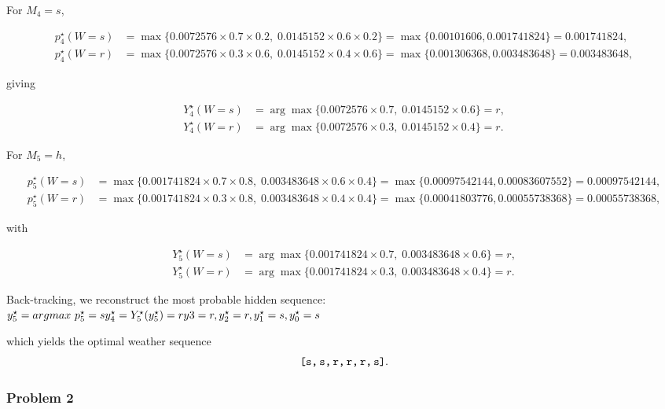 For $M_4=s$,

\[
\begin{aligned}
p^\star_4(W=s)&=\max\bigl\{0.0072576\times0.7\times0.2,\;0.0145152\times0.6\times0.2\bigr\}
               =\max\{0.00101606,0.001741824\}=0.001741824,\\
p^\star_4(W=r)&=\max\bigl\{0.0072576\times0.3\times0.6,\;0.0145152\times0.4\times0.6\bigr\}
               =\max\{0.001306368,0.003483648\}=0.003483648,
\end{aligned}
\]

giving

\[
\begin{aligned}
Y^\star_4(W=s)&=\arg\max\{0.0072576\times0.7,\;0.0145152\times0.6\}=r,\\
Y^\star_4(W=r)&=\arg\max\{0.0072576\times0.3,\;0.0145152\times0.4\}=r.
\end{aligned}
\]

For $M_5=h$,

\[
\begin{aligned}
p^\star_5(W=s)&=\max\bigl\{0.001741824\times0.7\times0.8,\;0.003483648\times0.6\times0.4\bigr\}
               =\max\{0.00097542144,0.00083607552\}=0.00097542144,\\
p^\star_5(W=r)&=\max\bigl\{0.001741824\times0.3\times0.8,\;0.003483648\times0.4\times0.4\bigr\}
               =\max\{0.00041803776,0.00055738368\}=0.00055738368,
\end{aligned}
\]

with

\[
\begin{aligned}
Y^\star_5(W=s)&=\arg\max\{0.001741824\times0.7,\;0.003483648\times0.6\}=r,\\
Y^\star_5(W=r)&=\arg\max\{0.001741824\times0.3,\;0.003483648\times0.4\}=r.
\end{aligned}
\]

Back-tracking, we reconstruct the most probable hidden sequence: \\
{\color{purple}
\begin{math}
y^\star_5 = argmax\ p^\star_5 = s \\
y^\star_4 = Y^\star_5(y^\star_5) = r \\
y3 = r, y^\star_2 = r,y^\star_1 = s,y^\star_0 = s
\end{math}
}

which yields the optimal weather sequence
\[
\texttt{[s,\,s,\,r,\,r,\,r,\,s]}.
\]




\subsubsection{Problem 2}

